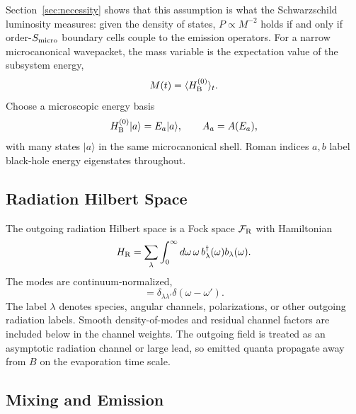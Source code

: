 \documentclass[12pt]{article}
\newcommand{\FR}{\mathcal F_{\rm R}}
\newcommand{\Smicro}{S_{\rm micro}}
\newcommand{\ket}[1]{|#1\rangle}
\begin{document}
Section~\ref{sec:necessity} shows that this assumption is what the
Schwarzschild luminosity measures: given the density of states,
$P\propto M^{-2}$ holds if and only if order-$\Smicro$ boundary cells couple
to the emission operators.
For a narrow microcanonical wavepacket, the mass variable is the expectation
value of the subsystem energy,
\begin{equation}
    M(t)=\langle H_{\rm B}^{(0)}\rangle_t.
\end{equation}
Choose a microscopic energy basis
\begin{equation}
    H_{\rm B}^{(0)}\ket a=E_a\ket a,\qquad A_a=A(E_a),
\end{equation}
with many states $\ket a$ in the same microcanonical shell.  Roman indices
$a,b$ label black-hole energy eigenstates throughout.

\subsection{Radiation Hilbert Space}

The outgoing radiation Hilbert space is a Fock space $\FR$ with Hamiltonian
\begin{equation}
    H_{\rm R}
    =
    \sum_\lambda\int_0^\infty d\omega\,
    \omega\, b_\lambda^\dagger(\omega)b_\lambda(\omega).
\end{equation}
The modes are continuum-normalized,
\begin{equation}
    [b_\lambda(\omega),b_{\lambda'}^\dagger(\omega')]
    =\delta_{\lambda\lambda'}\delta(\omega-\omega').
\end{equation}
The label $\lambda$ denotes species, angular channels, polarizations, or other
outgoing radiation labels.  Smooth density-of-modes and residual channel
factors are included below in the channel weights.  The outgoing field is
treated as an asymptotic radiation channel or large lead, so emitted quanta
propagate away from $B$ on the evaporation time scale.

\subsection{Mixing and Emission}
\end{document}
